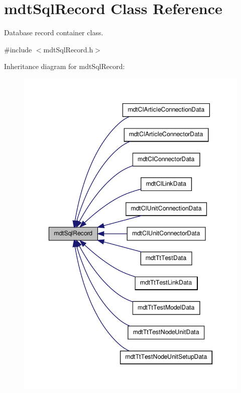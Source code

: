\hypertarget{classmdt_sql_record}{\section{mdt\-Sql\-Record Class Reference}
\label{classmdt_sql_record}
}


Database record container class.  




{\ttfamily \#include $<$mdt\-Sql\-Record.\-h$>$}



Inheritance diagram for mdt\-Sql\-Record\-:\nopagebreak
\begin{figure}[H]
\begin{center}
\leavevmode
\includegraphics[width=346pt]{classmdt_sql_record__inherit__graph}
\end{center}
\end{figure}



